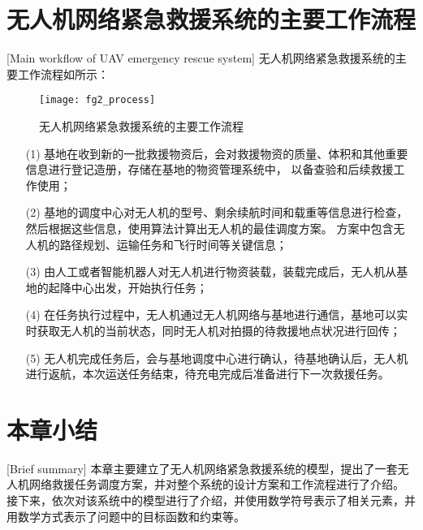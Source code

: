 \section{无人机网络紧急救援系统的主要工作流程}[Main workflow of UAV emergency rescue system]
无人机网络紧急救援系统的主要工作流程如所示：

\begin{figure}[ht]
	\centering
	\texttt{[image: fg2\_process]}
	\caption{无人机网络紧急救援系统的主要工作流程}
	\label{fg202}
\end{figure}

\begin{itemize}
	\item [(1)]基地在收到新的一批救援物资后，会对救援物资的质量、体积和其他重要信息进行登记造册，存储在基地的物资管理系统中，
	以备查验和后续救援工作使用； 
	\item [(2)]基地的调度中心对无人机的型号、剩余续航时间和载重等信息进行检查，然后根据这些信息，使用算法计算出无人机的最佳调度方案。
	方案中包含无人机的路径规划、运输任务和飞行时间等关键信息；
	\item [(3)]由人工或者智能机器人对无人机进行物资装载，装载完成后，无人机从基地的起降中心出发，开始执行任务；
	\item [(4)]在任务执行过程中，无人机通过无人机网络与基地进行通信，基地可以实时获取无人机的当前状态，同时无人机对拍摄的待救援地点状况进行回传；
	\item [(5)]无人机完成任务后，会与基地调度中心进行确认，待基地确认后，无人机进行返航，本次运送任务结束，待充电完成后准备进行下一次救援任务。
\end{itemize}

\section{本章小结}[Brief summary] 
本章主要建立了无人机网络紧急救援系统的模型，提出了一套无人机网络救援任务调度方案，并对整个系统的设计方案和工作流程进行了介绍。
接下来，依次对该系统中的模型进行了介绍，并使用数学符号表示了相关元素，并用数学方式表示了问题中的目标函数和约束等。

